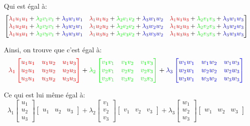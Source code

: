 \documentclass[a4paper]{article}
\begin{document}
{    Qui est égal à:
    \[\begin{bmatrix}
        {\color{red}\lambda_1 u_1 u_1} + {\color{green}\lambda_2 v_1 v_1} + {\color{blue}\lambda_3 w_1 w_1} & {\color{red} \lambda_1 u_1 u_2} + {\color{green}\lambda_2 v_1 v_2} + {\color{blue}\lambda_3 w_1 w_2} & {\color{red}\lambda_1 u_1 u_3} + {\color{green}\lambda_2 v_1 v_3} + {\color{blue}\lambda_3 w_1 w_3} \\
        {\color{red}\lambda_1 u_2 u_1} + {\color{green}\lambda_2 v_2 v_1} + {\color{blue}\lambda_3 w_2 w_1} & {\color{red} \lambda_1 u_2 u_2} + {\color{green}\lambda_2 v_2 v_2} + {\color{blue}\lambda_3 w_2 w_2} & {\color{red}\lambda_1 u_2 u_3} + {\color{green}\lambda_2 v_2 v_3} + {\color{blue}\lambda_3 w_2 w_3} \\
        {\color{red}\lambda_1 u_3 u_1} + {\color{green}\lambda_2 v_3 v_1} + {\color{blue}\lambda_3 w_3 w_1} & {\color{red} \lambda_1 u_3 u_2} + {\color{green}\lambda_2 v_3 v_2} + {\color{blue}\lambda_3 w_3 w_2} & {\color{red}\lambda_1 u_3 u_3} + {\color{green}\lambda_2 v_3 v_3} + {\color{blue}\lambda_3 w_3 w_3} 
    \end{bmatrix}\]

    Ainsi, on trouve que c'est égal à: 
    \[{\color{red} \lambda_1 \begin{bmatrix} u_1 u_1 & u_1 u_2 & u_1 u_3 \\ u_2 u_1 & u_2 u_2 & u_2 u_3 \\ u_3 u_1 & u_3 u_2 & u_3 u_3 \end{bmatrix} } + {\color{green} \lambda_2 \begin{bmatrix} v_1 v_1 & v_1 v_2 & v_1 v_3 \\ v_2 v_1 & v_2 v_2 & v_2 v_3 \\ v_3 v_1 & v_3 v_2 & v_3 v_3 \end{bmatrix} } + {\color{blue} \lambda_3 \begin{bmatrix} w_1 w_1 & w_1 w_2 & w_1 w_3 \\ w_2 w_1 & w_2 w_2 & w_2 w_3 \\ w_3 w_1 & w_3 w_2 & w_3 w_3 \end{bmatrix} }\]
    
    Ce qui est lui même égal à: 
    \[\lambda_1 \begin{bmatrix} u_1 \\ u_2 \\ u_3 \end{bmatrix} \begin{bmatrix} u_1 & u_2 & u_3 \end{bmatrix} + \lambda_2 \begin{bmatrix} v_1 \\ v_2 \\ v_3 \end{bmatrix} \begin{bmatrix} v_1 & v_2 & v_3 \end{bmatrix} + \lambda_3 \begin{bmatrix} w_1 \\ w_2 \\ w_3 \end{bmatrix} \begin{bmatrix} w_1 & w_2 & w_3 \end{bmatrix}\]

}
\end{document}
